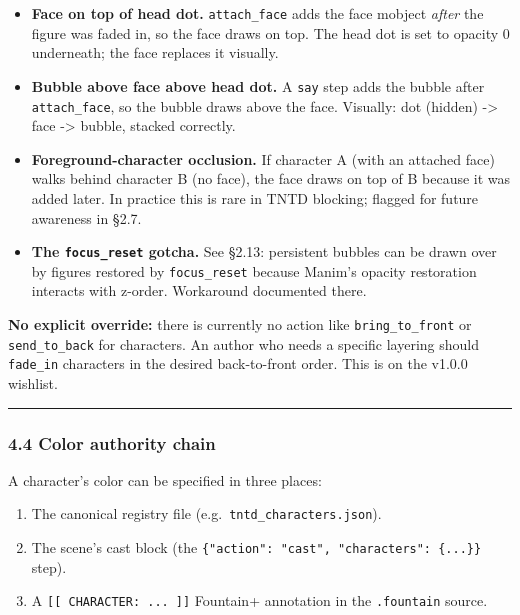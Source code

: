 \documentclass[
  12pt,
  letterpaper,
]{book}
\providecommand{\tightlist}{%
  \setlength{\itemsep}{0pt}\setlength{\parskip}{0pt}}
\begin{document}
\begin{itemize}
\tightlist
\item
  \textbf{Face on top of head dot.} \texttt{attach\_face} adds the face
  mobject \emph{after} the figure was faded in, so the face draws on
  top. The head dot is set to opacity 0 underneath; the face replaces it
  visually.
\item
  \textbf{Bubble above face above head dot.} A \texttt{say} step adds
  the bubble after \texttt{attach\_face}, so the bubble draws above the
  face. Visually: dot (hidden) -\textgreater{} face -\textgreater{}
  bubble, stacked correctly.
\item
  \textbf{Foreground-character occlusion.} If character A (with an
  attached face) walks behind character B (no face), the face draws on
  top of B because it was added later. In practice this is rare in TNTD
  blocking; flagged for future awareness in §2.7.
\item
  \textbf{The \texttt{focus\_reset} gotcha.} See §2.13: persistent
  bubbles can be drawn over by figures restored by \texttt{focus\_reset}
  because Manim's opacity restoration interacts with z-order. Workaround
  documented there.
\end{itemize}

\textbf{No explicit override:} there is currently no action like
\texttt{bring\_to\_front} or \texttt{send\_to\_back} for characters. An
author who needs a specific layering should \texttt{fade\_in} characters
in the desired back-to-front order. This is on the v1.0.0 wishlist.

\begin{center}\rule{0.5\linewidth}{0.5pt}\end{center}

\subsubsection{4.4 Color authority chain}\label{color-authority-chain}

A character's color can be specified in three places:

\begin{enumerate}
\def\labelenumi{\arabic{enumi}.}
\tightlist
\item
  The canonical registry file (e.g.~\texttt{tntd\_characters.json}).
\item
  The scene's cast block (the
  \texttt{\{"action":\ "cast",\ "characters":\ \{...\}\}} step).
\item
  A \texttt{{[}{[}\ CHARACTER:\ ...\ {]}{]}} Fountain+ annotation in the
  \texttt{.fountain} source.
\end{enumerate}
\end{document}
